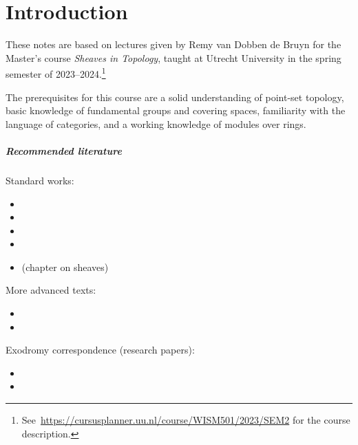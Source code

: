 \chapter*{Introduction}

These notes are based on lectures given by Remy van Dobben de Bruyn for the Master's course \emph{Sheaves in Topology}, taught at Utrecht University in the spring semester of 2023--2024.\footnote{See~\url{https://cursusplanner.uu.nl/course/WISM501/2023/SEM2} for the course description.}

The prerequisites for this course are a solid understanding of point-set topology, basic knowledge of fundamental groups and covering spaces, familiarity with the language of categories, and a working knowledge of modules over rings. 

\paragraph{Recommended literature}
Standard works:
\NewDocumentCommand{}
\begin{itemize}
\item {}
\item {}
\item {}
\item {}
\item {} (chapter on sheaves)
\end{itemize}
\noindent
More advanced texts:
\begin{itemize}
\item {}
\item {}
\end{itemize}
\noindent
Exodromy correspondence (research papers):
\begin{itemize}
\item {}
\item {}
\end{itemize}


